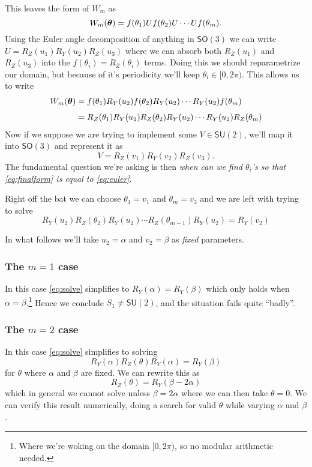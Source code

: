 \documentclass[12pt,dvipsnames]{article}
\newcommand{\SU}[1]{\mathsf{SU} (#1)}
\newcommand{\SO}[1]{\mathsf{SO} (#1)}
\newcommand{\1}{\mathbb{1}}
\theoremstyle{plain}
\begin{document}
This leaves the form of $W_m$ as
\begin{equation}
    W_m(\vb*{\theta}) = f(\theta_1)U f(\theta_2) U \cdots U f(\theta_m).
\end{equation}
Using the Euler angle decomposition of anything in $\SO{3}$ we can write $U = R_Z(u_1)R_Y(u_2)R_Z(u_3)$ where we can absorb both $R_Z(u_1)$ and $R_Z(u_3)$ into the $f(\theta_i) = R_Z(\theta_i)$ terms. Doing this we should reparametrize our domain, but because of it's periodicity we'll keep $\theta_i\in[0, 2\pi)$. %
This allows us to write
\begin{align}
    W_m(\vb*{\theta}) & = f(\theta_1)R_Y(u_2)f(\theta_2)R_Y(u_2)\cdots R_Y(u_2)f(\theta_m) \nonumber                  \\[0.4em]
                      & = R_Z(\theta_1)R_Y(u_2)R_Z(\theta_2)R_Y(u_2)\cdots R_Y(u_2)R_Z(\theta_m) \label{eq:finalform}
\end{align}
Now if we suppose we are trying to implement some $V\in\SU{2}$, we'll map it into $\SO{3}$ and represent it as
\begin{equation}\label{eq:euler}
    V = R_Z(v_1)R_Y(v_2)R_Z(v_3).
\end{equation}
The fundamental question we're asking is then \emph{when can we find $\theta_i$'s so that \cref{eq:finalform} is equal to \cref{eq:euler}}.

Right off the bat we can choose $\theta_1 = v_1$ and $\theta_m = v_3$ and we are left with trying to solve
\begin{equation}\label{eq:solve}
    R_Y(u_2)R_Z(\theta_2)R_Y(u_2)\cdots R_Z(\theta_{m - 1})R_Y(u_2) = R_Y(v_2)
\end{equation}

In what follows we'll take $u_2 = \alpha$ and $v_2 = \beta$ as \emph{fixed} parameters.


\subsubsection{The $m = 1$ case}
In this case \cref{eq:solve} simplifies to $R_Y(\alpha) = R_Y(\beta)$ which only holds when $\alpha = \beta$.\footnote{Where we're woking on the domain $[0, 2\pi)$, so no modular arithmetic needed.} Hence we conclude $S_1\neq \SU{2}$, and the situation fails quite ``badly''.


\subsubsection{The $m = 2$ case}
In this case \cref{eq:solve} simplifies to solving
\begin{equation}
    R_Y(\alpha)R_Z(\theta)R_Y(\alpha) = R_Y(\beta)
\end{equation}
for $\theta$ where $\alpha$ and $\beta$ are fixed. We can rewrite this as
\begin{equation}
    R_Z(\theta) = R_Y(\beta - 2\alpha)
\end{equation}
which in general we cannot solve unless $\beta = 2\alpha$ where we can then take $\theta = 0$. We can verify this result numerically, doing a search for valid $\theta$ while varying $\alpha$ and $\beta$.
\end{document}
